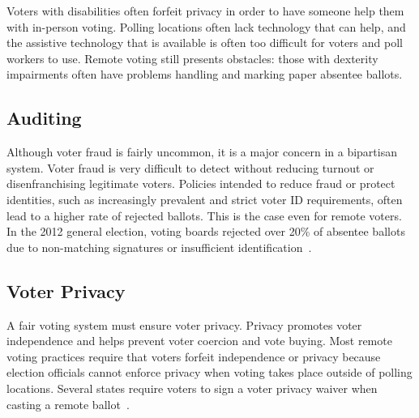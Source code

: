 Voters with disabilities often forfeit privacy in order to have
someone help them with in-person voting. Polling locations often lack
technology that can help, and the assistive technology that is
available is often too difficult for voters and poll workers to
use. Remote voting still presents obstacles: those with dexterity
impairments often have problems handling and marking paper absentee
ballots.

\subsection{Auditing}

Although voter fraud is fairly uncommon, it is a major concern in a
bipartisan system. Voter fraud is very difficult to detect without
reducing turnout or disenfranchising legitimate voters. Policies
intended to reduce fraud or protect identities, such as increasingly
prevalent and strict voter ID requirements, often lead to a higher
rate of rejected ballots. This is the case even for remote voters. In
the 2012 general election, voting boards rejected over 20\% of
absentee ballots due to non-matching signatures or insufficient
identification~\cite{eac2012survey}.

\subsection{Voter Privacy}

A fair voting system must ensure voter privacy. Privacy promotes voter
independence and helps prevent voter coercion and vote buying. Most
remote voting practices require that voters forfeit independence or
privacy because election officials cannot enforce privacy when voting
takes place outside of polling locations. Several states require
voters to sign a voter privacy waiver when casting a remote
ballot~\cite{smithtime}.


